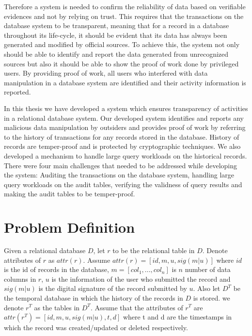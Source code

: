 Therefore a system is needed to confirm the reliability of data based on verifiable evidences and not by relying on trust. This requires that the transactions on the database system to be transparent, meaning that for a record in a database throughout its life-cycle, it should be evident that its data has always been generated and modified by official sources. To achieve this, the system not only should be able to identify and report the data generated from unrecognized sources but also it should be able to show the proof of work done by privileged users. By providing proof of work, all users who interfered with data manipulation in a database system are identified and their activity information is reported. 

In this thesis we have developed a system which ensures transparency of activities in a relational database system. Our developed system identifies and reports any malicious data manipulation by outsiders and provides proof of work by referring to the history of transactions for any records stored in the database. History of records are temper-proof and is protected by cryptographic techniques. We also developed a mechanism to handle large query workloads on the historical records. There were four main challenges that needed to be addressed while developing the system: Auditing the transactions on the database system, handling large query workloads on the audit tables, verifying the validness of query results and making the audit tables to be temper-proof. 
\section{Problem Definition}
Given a relational database $D$, let $r$ to be the relational table in $D$. Denote attributes of $r$ as $attr(r)$. Assume $attr(r)= [id,m,u, sig(m|u)]$ where $id$ is the id of records in the database, $m = [col_1,...,col_n]$ is $n$ number of data columns in $r$, $u$ is the information of the user who submitted the record and $sig(m|u)$ is the digital signature of the record submitted by $u$. Also let $D^T$ be the temporal database in which the history of the records in $D$ is stored. we denote $r^T$ as the tables in $D^T$. Assume that the attributes of $r^T$ are $attr(r^T) = [id,m,u,sig(m|u),t,d]$ where t and d are the timestamps in which the record was created/updated or deleted respectively.\\


